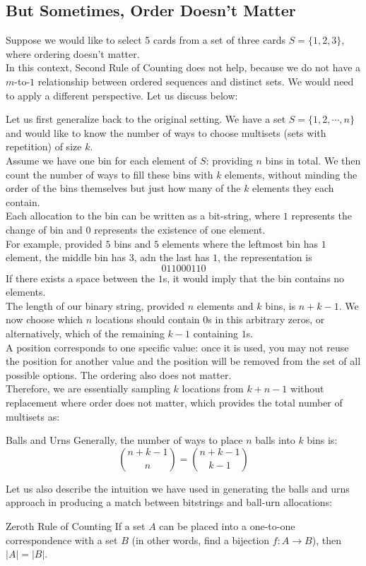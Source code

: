 \subsection{But Sometimes, Order Doesn't Matter}
Suppose we would like to select 5 cards from a set of three cards $S = \{1, 2, 3\}$, where ordering doesn't matter. \\
In this context, Second Rule of Counting does not help, because we do not have a $m$-to-$1$ relationship between ordered sequences and distinct sets. We would need to apply a different perspective. Let us discuss below:

Let us first generalize back to the original setting. We have a set $S = \{1, 2, \cdots, n\}$ and would like to know the number of ways to choose multisets (sets with repetition) of size $k$. \\
Assume we have one bin for each element of $S$: providing $n$ bins in total. We then count the number of ways to fill these bins with $k$ elements, without minding the order of the bins themselves but just how many of the $k$ elements they each contain. \\
Each allocation to the bin can be written as a bit-string, where $1$ represents the change of bin and $0$ represents the existence of one element. \\
For example, provided $5$ bins and $5$ elements where the leftmost bin has $1$ element, the middle bin has $3$, adn the last has $1$, the representation is
\[01 10001 10\]
If there exists a space between the $1$s, it would imply that the bin contains no elements. \\
The length of our binary string, provided $n$ elements and $k$ bins, is $n + k - 1$. We now choose which $n$ locations should contain $0$s in this arbitrary zeros, or alternatively, which of the remaining $k-1$ containing $1$s. \\
A position corresponds to one specific value: once it is used, you may not reuse the position for another value and the position will be removed from the set of all possible options. The ordering also does not matter. \\
Therefore, we are essentially sampling $k$ locations from $k + n - 1$ without replacement where order does not matter, which provides the total number of multisets as:
\begin{ln-theorem}{Balls and Urns}{}
    Generally, the number of ways to place $n$ balls into $k$ bins is:
    \[\binom{n + k - 1}{n} = \binom{n + k - 1}{k - 1}\]
\end{ln-theorem}
Let us also describe the intuition we have used in generating the balls and urns approach in producing a match between bitstrings and ball-urn allocations:
\begin{ln-theorem}{Zeroth Rule of Counting}{}
    If a set $A$ can be placed into a one-to-one correspondence with a set $B$ (in other words, find a bijection $f: A \rightarrow B$), then $|A| = |B|$.
\end{ln-theorem}

